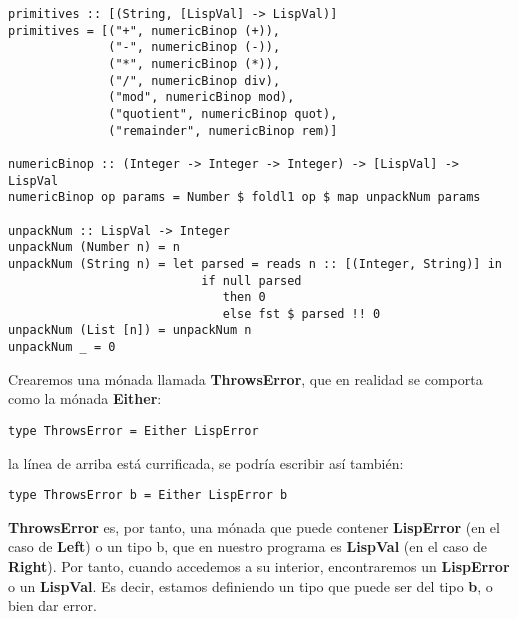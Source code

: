 \begin{minipage}{\linewidth}
\begin{footnotesize}
\begin{lstlisting}[frame=single]
primitives :: [(String, [LispVal] -> LispVal)]
primitives = [("+", numericBinop (+)),
              ("-", numericBinop (-)),
              ("*", numericBinop (*)),
              ("/", numericBinop div),
              ("mod", numericBinop mod),
              ("quotient", numericBinop quot),
              ("remainder", numericBinop rem)]

numericBinop :: (Integer -> Integer -> Integer) -> [LispVal] -> LispVal
numericBinop op params = Number $ foldl1 op $ map unpackNum params
 
unpackNum :: LispVal -> Integer
unpackNum (Number n) = n
unpackNum (String n) = let parsed = reads n :: [(Integer, String)] in 
                           if null parsed 
                              then 0
                              else fst $ parsed !! 0
unpackNum (List [n]) = unpackNum n
unpackNum _ = 0
\end{lstlisting}
\end{footnotesize}
\end{minipage}

Crearemos una m\'onada llamada \textbf{ThrowsError}, que en realidad se comporta como la m\'onada \textbf{Either}:\\

\begin{minipage}{\linewidth}
\begin{small}
\begin{lstlisting}[frame=single]
type ThrowsError = Either LispError
\end{lstlisting}
\end{small}
\end{minipage}

la l\'inea de arriba est\'a currificada, se podr\'ia escribir as\'i tambi\'en:\\

\begin{minipage}{\linewidth}
\begin{small}
\begin{lstlisting}[frame=single]
type ThrowsError b = Either LispError b
\end{lstlisting}
\end{small}
\end{minipage}

\textbf{ThrowsError} es, por tanto, una m\'onada que puede contener \textbf{LispError} (en el caso de \textbf{Left}) o un tipo b, que en nuestro programa es \textbf{LispVal} (en el caso de \textbf{Right}). Por tanto, cuando accedemos a su interior, encontraremos un \textbf{LispError} o un \textbf{LispVal}. Es decir, estamos definiendo un tipo que puede ser del tipo \textbf{b}, o bien dar error.\\

